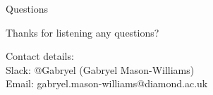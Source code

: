 \begin{frame}{Questions}
\begin{center}
    Thanks for listening any questions?    
\end{center}{}
\begin{center}
    Contact details:
    \\
        Slack: @Gabryel (Gabryel Mason-Williams)
    \\
        Email: gabryel.mason-williams@diamond.ac.uk 
\end{center}{}
\end{frame}
